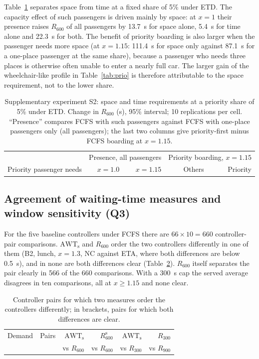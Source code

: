 \documentclass[12pt,a4paper]{article}
\begin{document}
Table~\ref{tab:s2b} separates space from time at a fixed share of 5\% under ETD. The capacity effect of such passengers is driven mainly by space: at $x=1$ their presence raises $R_{600}$ of all passengers by 13.7~s for space alone, 5.4~s for time alone and 22.3~s for both. The benefit of priority boarding is also larger when the passenger needs more space (at $x=1.15$: 111.4~s for space only against 87.1~s for a one-place passenger at the same share), because a passenger who needs three places is otherwise often unable to enter a nearly full car. The larger gain of the wheelchair-like profile in Table~\ref{tab:prio} is therefore attributable to the space requirement, not to the lower share.

\begin{table}[htbp]\centering
\caption{Supplementary experiment S2: space and time requirements at a priority share of 5\% under ETD. Change in $R_{600}$ (s), 95\% interval; 10 replications per cell. ``Presence'' compares FCFS with such passengers against FCFS with one-place passengers only (all passengers); the last two columns give priority-first minus FCFS boarding at $x=1.15$.}\label{tab:s2b}
\footnotesize\setlength{\tabcolsep}{4pt}
\begin{tabular}{@{}lrrrr@{}}
\toprule & \multicolumn{2}{c}{Presence, all passengers} & \multicolumn{2}{c}{Priority boarding, $x=1.15$}\\
Priority passenger needs & $x=1.0$ & $x=1.15$ & Others & Priority\\\midrule

\end{tabular}
\end{table}

\subsection{Agreement of waiting-time measures and window sensitivity (Q3)}\label{sec:res-agree}
For the five baseline controllers under FCFS there are $66\times10=660$ controller-pair comparisons. $\mathrm{AWT}_{\mathrm{s}}$ and $R_{600}$ order the two controllers differently in one of them (B2, lunch, $x=1.3$, NC against ETA, where both differences are below 0.5~s), and in none are both differences clear (Table~\ref{tab:disc}). $R_{600}$ itself separates the pair clearly in 566 of the 660 comparisons. With a 300~s cap the served average disagrees in ten comparisons, all at $x\ge1.15$ and none clear.

\begin{table}[htbp]\centering
\caption{Controller pairs for which two measures order the controllers differently; in brackets, pairs for which both differences are clear.}\label{tab:disc}
\small\begin{tabular}{@{}lrrrrr@{}}
\toprule Demand & Pairs & $\mathrm{AWT}_{\mathrm{s}}$ & $R_{600}^{\mathrm{s}}$ & $\mathrm{AWT}_{\mathrm{s}}$ & $R_{300}$\\
 & & vs $R_{600}$ & vs $R_{600}$ & vs $R_{300}$ & vs $R_{900}$\\\midrule

\end{tabular}
\end{table}
\end{document}
